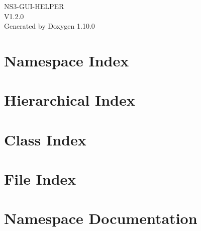 \documentclass[twoside]{book}
\newcommand{\+}{\discretionary{\mbox{\scriptsize$\hookleftarrow$}}{}{}}
\newcommand{\clearemptydoublepage}{%
    \newpage{\pagestyle{empty}\cleardoublepage}%
  }
\begin{document}
  \raggedbottom
  \begin{titlepage}
  \vspace*{7cm}
  \begin{center}%
  {\Large NS3-\/\+GUI-\/\+HELPER}\\
  [1ex]\large V1.\+2.\+0 \\
  \vspace*{1cm}
  {\large Generated by Doxygen 1.10.0}\\
  \end{center}
  \end{titlepage}
  \clearemptydoublepage
  \tableofcontents
  \clearemptydoublepage

\chapter{Namespace Index}

\chapter{Hierarchical Index}

\chapter{Class Index}

\chapter{File Index}

\chapter{Namespace Documentation}








\end{document}
